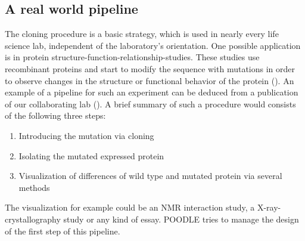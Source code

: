 \documentclass{bioinfo}
\begin{document}
\subsection{A real world pipeline}
The cloning procedure is a basic strategy, which is used in nearly every life science lab, 
independent of the laboratory's orientation. One possible application is in protein 
structure-function-relationship-studies. These studies use recombinant proteins and start to modify 
the sequence with mutations in order to observe changes in the structure or functional 
behavior of the protein (\citealp{Clark1}). An example of a pipeline for such an experiment can be 
deduced from a publication of our collaborating lab (\citealp{Mira}). A brief summary of such a procedure would consists 
of the following three steps: 
\begin{enumerate}
 \item Introducing the mutation via cloning
 \item Isolating the mutated expressed protein
 \item Visualization of differences of wild type and mutated protein via several methods
\end{enumerate}   
The visualization for example could be an NMR interaction study, a X-ray-crystallography study or 
any kind of essay. POODLE tries to manage the design of the first step of this pipeline.
\end{document}
